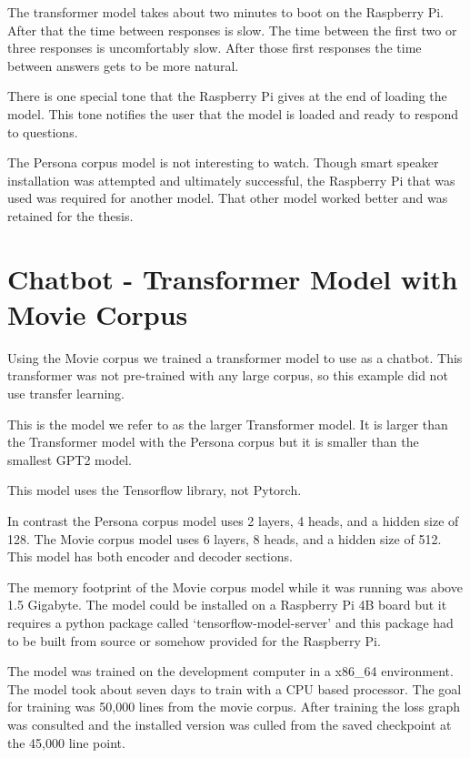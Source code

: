 The transformer model takes about two minutes to boot on the Raspberry Pi. After that the time between responses is slow. The time between the first two or three responses is uncomfortably slow. After those first responses the time between answers gets to be more natural.

There is one special tone that the Raspberry Pi gives at the end of loading the model. This tone notifies the user that the model is loaded and ready to respond to questions.

The Persona corpus model is not interesting to watch. Though smart speaker installation was attempted and ultimately successful, the Raspberry Pi that was used was required for another model. That other model worked better and was retained for the thesis.

\section{Chatbot - Transformer Model with Movie Corpus}


Using the Movie corpus we trained a transformer model to use as a chatbot. This transformer was not pre-trained with any large corpus, so this example did not use transfer learning. 

This is the model we refer to as the larger Transformer model. It is larger than the Transformer model with the Persona corpus but it is smaller than the smallest GPT2 model.

This model uses the Tensorflow library, not Pytorch. %

In contrast the Persona corpus model uses 2 layers, 4 heads, and a hidden size of 128. The Movie corpus model uses 6 layers, 8 heads, and a hidden size of 512. This model has both encoder and decoder sections.

The memory footprint of the Movie corpus model while it was running was above 1.5 Gigabyte. The model could be installed on a Raspberry Pi 4B board but it requires a python package called `tensorflow-model-server' and this package had to be built from source or somehow provided for the Raspberry Pi. 

The model was trained on the development computer in a x86\_64 environment. The model took about seven days to train with a CPU based processor. The goal for training was 50,000 lines from the movie corpus. After training the loss graph was consulted and the installed version was culled from the saved checkpoint at the 45,000 line point.


